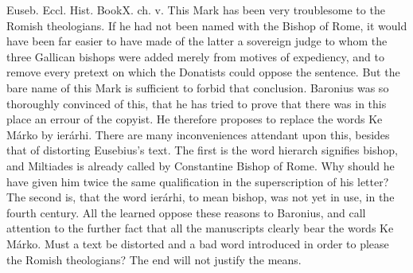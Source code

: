 Euseb. Eccl. Hist. BookX. ch. v. This Mark has been very troublesome to the Romish theologians. If he had not been named with the Bishop of Rome, it would have been far easier to have made of the latter a sovereign judge to whom the three Gallican bishops were added merely from motives of expediency, and to remove every pretext on which the Donatists could oppose the sentence. But the bare name of this Mark is sufficient to forbid that conclusion. Baronius was so thoroughly convinced of this, that he has tried to prove that there was in this place an errour of the copyist. He therefore proposes to replace the words Ke Márko by ierárhi. There are many inconveniences attendant upon this, besides that of distorting Eusebius’s text. The first is the word hierarch signifies bishop, and Miltiades is already called by Constantine Bishop of Rome. Why should he have given him twice the same qualification in the superscription of his letter? The second is, that the word ierárhi, to mean bishop, was not yet in use, in the fourth century. All the learned oppose these reasons to Baronius, and call attention to the further fact that all the manuscripts clearly bear the words Ke Márko. Must a text be distorted and a bad word introduced in order to please the Romish theologians? The end will not justify the means.

